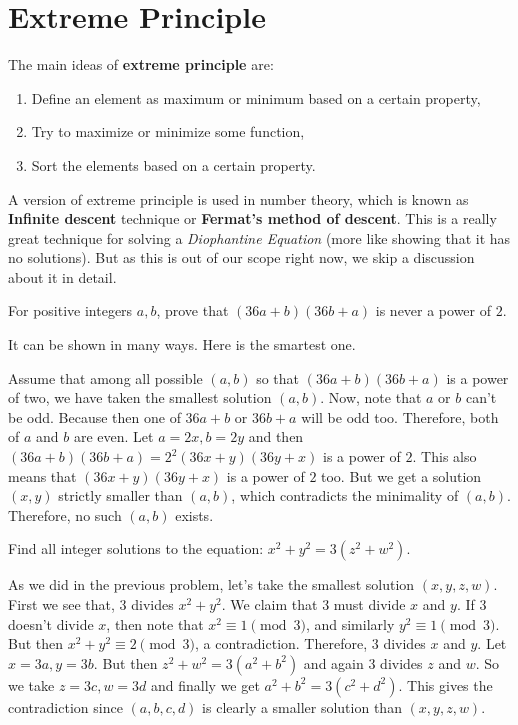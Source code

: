 \documentclass[nt_billal_v1.tex]{subfile}
\begin{document}
\section{Extreme Principle}
The main ideas of \textbf{extreme principle} are:
	\begin{enumerate}[i]
		\item Define an element as maximum or minimum based on a certain property,
		\item Try to maximize or minimize some function,
		\item Sort the elements based on a certain property.
	\end{enumerate}
A version of extreme principle is used in number theory, which is known as \textbf{Infinite descent} technique or \textbf{Fermat's method of descent}. This is a really great technique for solving a \textit{Diophantine Equation }(more like showing that it has no solutions). But as this is out of our scope right now, we skip a discussion about it in detail.

\begin{problem}
	For positive integers $a,b$, prove that $(36a+b)(36b+a)$ is never a power of $2$.
\end{problem}

\begin{solution}
	It can be shown in many ways. Here is the smartest one.
	
	Assume that among all possible $(a,b)$ so that $(36a+b)(36b+a)$ is a power of two, we have taken the smallest solution $(a,b)$. Now, note that $a$ or $b$ can't be odd. Because then one of $36a+b$ or $36b+a$ will be odd too. Therefore, both of $a$ and $b$ are even. Let $a=2x,b=2y$ and then $(36a+b)(36b+a)=2^2(36x+y)(36y+x)$ is a power of $2$. This also means that $(36x+y)(36y+x)$ is a power of $2$ too. But we get a solution $(x,y)$ strictly smaller than $(a,b)$, which contradicts the minimality of $(a,b)$. Therefore, no such $(a,b)$ exists.
\end{solution}

\begin{problem}
	Find all integer solutions to the equation: $x^2+y^2=3(z^2+w^2)$.
\end{problem}

\begin{solution}
	As we did in the previous problem, let's take the smallest 
	solution $(x,y,z,w)$. First we see that, $3$ divides $x^2+y^2$.
	We claim that $3$ must divide $x$ and $y$. If $3$ doesn't divide
	$x$, then note that $x^2\equiv1\pmod3$, and similarly
	$y^2\equiv1\pmod3$. But then $x^2+y^2\equiv2\pmod3$, a
	contradiction. Therefore, $3$ divides $x$ and $y$. Let
	$x=3a,y=3b$. But then $z^2+w^2=3(a^2+b^2)$ and again $3$ divides
	$z$ and $w$. So we take $z=3c,w=3d$ and finally we get $a^2+b^2
	=3(c^2+d^2)$. This gives the contradiction since $(a,b,c,d)$ is 
	clearly a smaller solution than $(x,y,z,w)$.
\end{solution}
\end{document}
